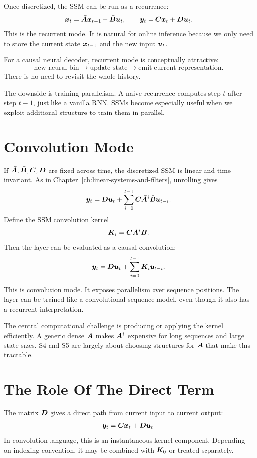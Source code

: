 Once discretized, the SSM can be run as a recurrence:
\[
  \bm{x}_t = \bar{\bm{A}}\bm{x}_{t-1} + \bar{\bm{B}}\bm{u}_t,
  \qquad
  \bm{y}_t = \bm{C}\bm{x}_t + \bm{D}\bm{u}_t.
\]
This is the recurrent mode. It is natural for online inference because we only need to
store the current state $\bm{x}_{t-1}$ and the new input $\bm{u}_t$.

For a causal neural decoder, recurrent mode is conceptually attractive:
\[
  \text{new neural bin} \rightarrow \text{update state} \rightarrow \text{emit current representation}.
\]
There is no need to revisit the whole history.

The downside is training parallelism. A naive recurrence computes step $t$ after step
$t-1$, just like a vanilla RNN. SSMs become especially useful when we exploit additional
structure to train them in parallel.

\section{Convolution Mode}

If $\bar{\bm{A}},\bar{\bm{B}},\bm{C},\bm{D}$ are fixed across time, the discretized SSM is linear and
time invariant. As in Chapter~\ref{ch:linear-systems-and-filters}, unrolling gives
\[
  \bm{y}_t
  =
  \bm{D}\bm{u}_t
  +
  \sum_{i=0}^{t-1}
  \bm{C}\bar{\bm{A}}^i\bar{\bm{B}}\bm{u}_{t-i}.
\]
Define the SSM convolution kernel
\begin{equation}
  \bm{K}_i = \bm{C}\bar{\bm{A}}^i\bar{\bm{B}}.
  \label{eq:discrete-ssm-kernel}
\end{equation}
Then the layer can be evaluated as a causal convolution:
\[
  \bm{y}_t = \bm{D}\bm{u}_t + \sum_{i=0}^{t-1}\bm{K}_i\bm{u}_{t-i}.
\]

This is convolution mode. It exposes parallelism over sequence positions. The layer can
be trained like a convolutional sequence model, even though it also has a recurrent
interpretation.

The central computational challenge is producing or applying the kernel efficiently. A
generic dense $\bar{\bm{A}}$ makes $\bar{\bm{A}}^i$ expensive for long sequences and large state
sizes. S4 and S5 are largely about choosing structures for $\bar{\bm{A}}$ that make this
tractable.

\section{The Role Of The Direct Term}

The matrix $\bm{D}$ gives a direct path from current input to current output:
\[
  \bm{y}_t = \bm{C}\bm{x}_t + \bm{D}\bm{u}_t.
\]
In convolution language, this is an instantaneous kernel component. Depending on indexing
convention, it may be combined with $\bm{K}_0$ or treated separately.

